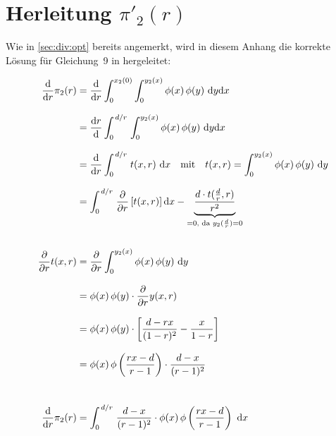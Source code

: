 
\chapter{Herleitung \texorpdfstring{$\pi'_2(r)$}{pi2'(r)}}%
\label{appendix:pi2}

Wie in \cref{sec:div:opt} bereits angemerkt, wird in diesem Anhang die korrekte Lösung für Gleichung~9 in \textcite[\pno~378(6)]{Wagner-2010} hergeleitet:

\begin{align}
	\dv{r} \pi_2(r) & = \dv{r} \int_0^{x_2(0)} \int_0^{y_2(x)} \phi(x)\,\phi(y)\ \dd y \dd x                                                                                  \label{eqn:appendix:A1} \\[0.8em]
	                & = \dv{r}{} \int_0^{\flatfrac{d}{r}} \int_0^{y_2(x)} \phi(x)\,\phi(y)\ \dd y \dd x                                                                       \label{eqn:appendix:A2} \\[0.8em]
	                & = \dv{r} \int_0^{\flatfrac{d}{r}} t(x, r)\ \dd x \quad \text{mit} \quad t(x,r) = \int_0^{y_2(x)} \phi(x)\,\phi(y)\ \dd y                                \label{eqn:appendix:A3} \\[0.8em]
	                & = \int_0^{\flatfrac{d}{r}} \pdv{r} \left[t(x, r)\right] \dd x - \underbrace{\frac{d \cdot t(\frac{d}{r}, r)}{r^2}}_{=0 \text{, da } y_2(\frac{d}{r})=0} \label{eqn:appendix:A4} \\
	\nonumber \\
	\pdv{r} t(x, r) & = \pdv{r} \int_0^{y_2(x)} \phi(x)\,\phi(y)\ \dd y                                                                                                       \label{eqn:appendix:A5} \\[0.8em]
	                & = \phi(x)\,\phi(y) \cdot \pdv{r} y(x,r)                                                                                                                 \label{eqn:appendix:A6} \\[0.8em]
	                & = \phi(x)\,\phi(y) \cdot \left[ \frac{d-rx}{(1-r)^2} - \frac{x}{1-r} \right]                                                                            \label{eqn:appendix:A7} \\[0.8em]
	                & = \phi(x)\,\phi\left(\frac{rx-d}{r-1}\right)  \cdot \frac{d-x}{(r-1)^2}                                                                                 \label{eqn:appendix:A8} \\[0.8em]
	\nonumber \\
	\dv{r} \pi_2(r) & = \int_0^{\flatfrac{d}{r}} \frac{d-x}{(r-1)^2} \cdot \phi(x)\,\phi\left(\frac{rx-d}{r-1}\right)\ \dd x                                                  \label{eqn:appendix:A9}
\end{align}

